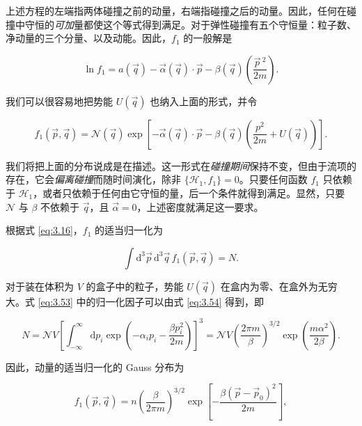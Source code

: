 上述方程的左端指两体碰撞之前的动量，右端指碰撞之后的动量。因此，任何在碰撞中守恒的\emph{可加}量都使这个等式得到满足。对于弹性碰撞有五个守恒量：粒子数、净动量的三个分量、以及动能。因此，$f_1$ 的一般解是

\begin{equation}\label{eq:3.52}
  \ln f_1=a(\vec q)-\vec\alpha(\vec q)\cdot\vec p-\beta(\vec q)\left(\frac{\vec p\,^2}{2m}\right).
\end{equation}

我们可以很容易地把势能 $U(\vec q)$ 也纳入上面的形式，并令

\begin{equation}\label{eq:3.53}
  f_1(\vec p,\vec q)=\mathcal N(\vec q)\exp\left[-\vec\alpha(\vec q)\cdot\vec p-\beta(\vec q)\left(\frac{p^2}{2m}+U(\vec q)\right)\right].
\end{equation}

我们将把上面的分布说成是在描述。这一形式在\emph{碰撞期间}保持不变，但由于流项的存在，它会\emph{偏离碰撞}而随时间演化，除非 $\{\mathcal H_1,f_1\}=0$。只要任何函数 $f_1$ 只依赖于 $\mathcal H_1$，或者只依赖于任何由它守恒的量，后一个条件就得到满足。显然，只要 $\mathcal N$ 与 $\beta$ 不依赖于 $\vec q$，且 $\vec\alpha=0$，上述密度就满足这一要求。

根据式 \eqref{eq:3.16}，$f_1$ 的适当归一化为

\begin{equation}\label{eq:3.54}
  \int \mathrm{d}^3\vec p\,\mathrm{d}^3\vec q\,f_1(\vec p,\vec q)=N.
\end{equation}

对于装在体积为 $V$ 的盒子中的粒子，势能 $U(\vec q)$ 在盒内为零、在盒外为无穷大。式 \eqref{eq:3.53} 中的归一化因子可以由式 \eqref{eq:3.54} 得到，即

\begin{equation}\label{eq:3.55}
  N=\mathcal N V\left[\int_{-\infty}^{\infty}\mathrm{d}p_i\exp\left(-\alpha_ip_i-\frac{\beta p_i^2}{2m}\right)\right]^3=\mathcal N V\left(\frac{2\pi m}{\beta}\right)^{3/2}\exp\left(\frac{m\alpha^2}{2\beta}\right).
\end{equation}

因此，动量的适当归一化的 Gauss 分布为

\begin{equation}\label{eq:3.56}
  f_1(\vec p,\vec q)=n\left(\frac{\beta}{2\pi m}\right)^{3/2}\exp\left[-\frac{\beta(\vec p-\vec p_0)^2}{2m}\right],
\end{equation}

